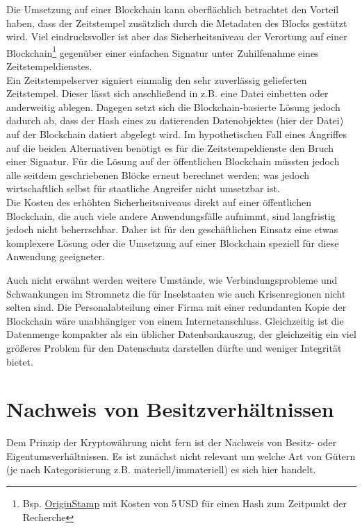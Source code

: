 Die Umsetzung auf einer Blockchain kann oberflächlich betrachtet den Vorteil haben, dass der Zeitstempel zusätzlich durch die Metadaten des Blocks gestützt wird. Viel eindrucksvoller ist aber das Sicherheitsniveau der Verortung auf einer Blockchain\footnote{Bsp. \href{https://app.originstamp.org/}{OriginStamp} mit Kosten von 5\,USD für einen Hash zum Zeitpunkt der Recherche} gegenüber einer einfachen Signatur unter Zuhilfenahme eines Zeitstempeldienstes. \\
Ein Zeitstempelserver signiert einmalig den sehr zuverlässig gelieferten Zeitstempel. Dieser lässt sich anschließend in z.B. eine Datei einbetten oder anderweitig ablegen. Dagegen setzt sich die Blockchain-basierte Lösung jedoch dadurch ab, dass der Hash eines zu datierenden Datenobjektes (hier der Datei) auf der Blockchain datiert abgelegt wird. Im hypothetischen Fall eines Angriffes auf die beiden Alternativen benötigt es für die Zeitstempeldienste den Bruch einer Signatur. Für die Lösung auf der öffentlichen Blockchain müssten jedoch alle seitdem geschriebenen Blöcke erneut berechnet werden; was jedoch wirtschaftlich selbst für staatliche Angreifer nicht umsetzbar ist. \\
Die Kosten des erhöhten Sicherheitsniveaus direkt auf einer öffentlichen Blockchain, die auch viele andere Anwendungsfälle aufnimmt, sind langfristig jedoch nicht beherrschbar. Daher ist für den geschäftlichen Einsatz eine etwas komplexere Lösung oder die Umsetzung auf einer Blockchain speziell für diese Anwendung geeigneter.

Auch nicht erwähnt werden weitere Umstände, wie Verbindungsprobleme und Schwankungen im Stromnetz die für Inselstaaten wie auch Krisenregionen nicht selten sind. Die Personalabteilung einer Firma mit einer redundanten Kopie der Blockchain wäre unabhängiger von einem Internetanschluss. Gleichzeitig ist die Datenmenge kompakter als ein üblicher Datenbankauszug, der gleichzeitig ein viel größeres Problem für den Datenschutz darstellen dürfte und weniger Integrität bietet.

\section{Nachweis von Besitzverhältnissen}

Dem Prinzip der Kryptowährung nicht fern ist der Nachweis von Besitz- oder Eigentumsverhältnissen. Es ist zunächst nicht relevant um welche Art von Gütern (je nach Kategorisierung z.B. materiell/immateriell) es sich hier handelt.

